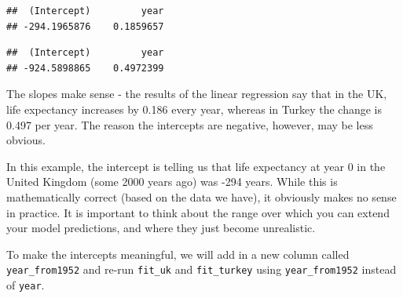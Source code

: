 \documentclass[
  12pt,
  krantz2]{krantz}
\makeatletter
\newenvironment{Shaded}{\begin{snugshade}}{\end{snugshade}}
\newcommand{\DataTypeTok}[1]{\textcolor[rgb]{0.13,0.29,0.53}{#1}}
\newcommand{\DecValTok}[1]{\textcolor[rgb]{0.00,0.00,0.81}{#1}}
\newcommand{\KeywordTok}[1]{\textcolor[rgb]{0.13,0.29,0.53}{\textbf{#1}}}
\newcommand{\NormalTok}[1]{#1}
\newcommand{\OperatorTok}[1]{\textcolor[rgb]{0.81,0.36,0.00}{\textbf{#1}}}
\newcommand{\StringTok}[1]{\textcolor[rgb]{0.31,0.60,0.02}{#1}}
\newenvironment{kframe}{%
\medskip{}
\setlength{\fboxsep}{.8em}
 \def\at@end@of@kframe{}%
 \ifinner\ifhmode%
  \def\at@end@of@kframe{\end{minipage}}%
  \begin{minipage}{\columnwidth}%
 \fi\fi%
 \def\FrameCommand##1{\hskip\@totalleftmargin \hskip-\fboxsep
 \colorbox{shadecolor}{##1}\hskip-\fboxsep
     \hskip-\linewidth \hskip-\@totalleftmargin \hskip\columnwidth}%
 \MakeFramed {\advance\hsize-\width
   \@totalleftmargin\z@ \linewidth\hsize
   \@setminipage}}%
 {\par\unskip\endMakeFramed%
 \at@end@of@kframe}
\renewenvironment{Shaded}{\begin{kframe}}{\end{kframe}}
\makeatother
\begin{document}
\begin{Shaded}
\end{Shaded}

\begin{verbatim}
##  (Intercept)         year 
## -294.1965876    0.1859657
\end{verbatim}

\begin{Shaded}
\end{Shaded}

\begin{verbatim}
##  (Intercept)         year 
## -924.5898865    0.4972399
\end{verbatim}

The slopes make sense - the results of the linear regression say that in the UK, life expectancy increases by 0.186 every year, whereas in Turkey the change is 0.497 per year.
The reason the intercepts are negative, however, may be less obvious.

In this example, the intercept is telling us that life expectancy at year 0 in the United Kingdom (some 2000 years ago) was -294 years.
While this is mathematically correct (based on the data we have), it obviously makes no sense in practice.
It is important to think about the range over which you can extend your model predictions, and where they just become unrealistic.

To make the intercepts meaningful, we will add in a new column called \texttt{year\_from1952} and re-run \texttt{fit\_uk} and \texttt{fit\_turkey} using \texttt{year\_from1952} instead of \texttt{year}.

\begin{Shaded}
\end{Shaded}
\end{document}
